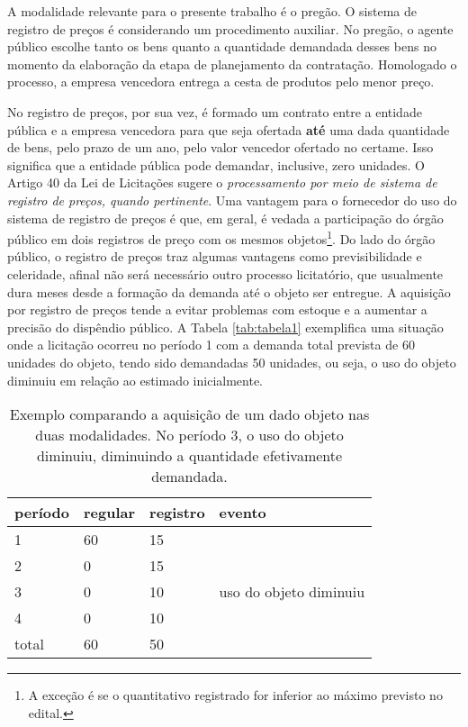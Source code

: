 A modalidade relevante para o presente trabalho é o pregão. O sistema de registro de preços é considerando um procedimento auxiliar. No pregão, o agente público escolhe tanto os bens quanto a quantidade demandada desses bens no momento da elaboração da etapa de planejamento da contratação. Homologado o processo, a empresa vencedora entrega a cesta de produtos pelo menor preço.

No registro de preços, por sua vez, é formado um contrato entre a entidade pública e a empresa vencedora para que seja ofertada \textbf{até} uma dada quantidade de bens, pelo prazo de um ano, pelo valor vencedor ofertado no certame. Isso significa que a entidade pública pode demandar, inclusive, zero unidades. O Artigo 40 da Lei de Licitações sugere o \emph{processamento por meio de sistema de registro de preços, quando pertinente}. Uma vantagem para o fornecedor do uso do sistema de registro de preços é que, em geral, é vedada a participação do órgão público em dois registros de preço com os mesmos objetos\footnote{A exceção é se o quantitativo registrado for inferior ao máximo previsto no edital.}. Do lado do órgão público, o registro de preços traz algumas vantagens como previsibilidade e celeridade, afinal não será necessário outro processo licitatório, que usualmente dura meses desde a formação da demanda até o objeto ser entregue. A aquisição por registro de preços tende a evitar problemas com estoque e a aumentar a precisão do dispêndio público. A Tabela \ref{tab:tabela1} exemplifica uma situação onde a licitação ocorreu no período 1 com a demanda total prevista de 60 unidades do objeto, tendo sido demandadas 50 unidades, ou seja, o uso do objeto diminuiu em relação ao estimado inicialmente.

\begin{table}[]
	\label{tab:tabela-rp}
	\centering
	\begin{tabular}{@{}llll@{}}
		\toprule
		período & regular & registro & evento                 \\ \midrule
		1       & 60      & 15       &                        \\
		2       & 0       & 15       &                        \\
		3       & 0       & 10       & uso do objeto diminuiu \\
		4       & 0       & 10       &                        \\
		total   & 60      & 50       &                        \\ \bottomrule
	\end{tabular}
	\caption{Exemplo comparando a aquisição de um dado objeto nas duas modalidades. No período 3, o uso do objeto diminuiu, diminuindo a quantidade efetivamente demandada.}
\end{table}

